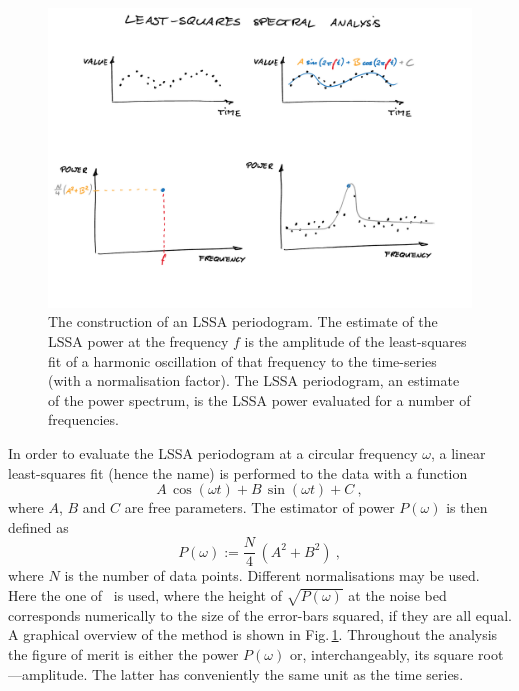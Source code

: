 \begin{figure}
  \centering \includegraphics[width=\linewidth]{gfx/axions/LSSA}
  \caption{The construction of an LSSA periodogram. The estimate of the LSSA power at the frequency $f$ is the amplitude of the least-squares fit of a harmonic oscillation of that frequency to the time-series (with a normalisation factor). The LSSA periodogram, an estimate of the power spectrum, is the LSSA power evaluated for a number of frequencies.}\label{fig:LSSA_overview}
\end{figure}

In order to evaluate the LSSA periodogram at a circular frequency $\omega$, a linear least-squares fit (hence the name) is performed to the data with a function
\begin{equation}
  A\,\cos(\omega t) + B\,\sin(\omega t) + C \ ,
\end{equation}
where $A$, $B$ and $C$ are free parameters. The estimator of power $P(\omega)$ is then defined as
\begin{equation}
  P(\omega) := \frac{N}{4} \, \left( A^2 + B^2 \right) \ ,
\end{equation}
where $N$ is the number of data points. Different normalisations may be used.
Here the one of~\cite{Scargle1982} is used, where the height of $\sqrt{P(\omega)}$ at the noise bed corresponds numerically to the size of the error-bars squared, if they are all equal. A graphical overview of the method is shown in Fig.\,\ref{fig:LSSA_overview}. Throughout the analysis the figure of merit is either the power $P(\omega)$ or, interchangeably, its square root---amplitude. The latter has conveniently the same unit as the time series.

